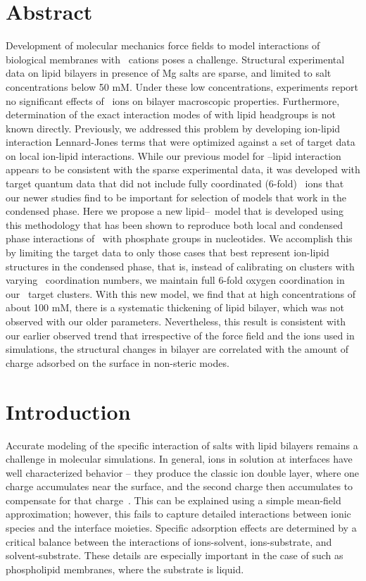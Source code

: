 \section{Abstract}

Development of molecular mechanics force fields to model interactions of biological membranes with \mg~cations poses a challenge.
Structural experimental data on lipid bilayers in presence of Mg salts are sparse, and limited to salt concentrations below 50 mM.
Under these low concentrations, experiments report no significant effects of \mg~ions  on bilayer macroscopic properties.
Furthermore, determination of the exact interaction modes of \mg with lipid headgroups is not known directly.
Previously, we addressed this problem by developing ion-lipid interaction
Lennard-Jones terms that were optimized against a set of target data on local ion-lipid interactions.
While our previous model for \mg--lipid interaction appears to be consistent with the sparse experimental data,
it was developed with target quantum data that did not include fully coordinated (6-fold) \mg~ions that our newer studies find to be important for selection of models that work in the condensed phase.
Here we propose a new lipid--\mg~model that
is developed using this methodology that has been shown to reproduce both local and condensed phase interactions of \mg~with phosphate groups in nucleotides.
We accomplish this by limiting the target data to only those cases that best represent ion-lipid structures in the condensed phase,
that is, instead of calibrating on clusters with varying \mg~coordination numbers, we maintain full 6-fold oxygen coordination in our
\mg~target clusters. With this new model, we find that at high concentrations of about 100 mM, there is a
systematic thickening of lipid bilayer, which was not observed with our older \mg{} parameters. Nevertheless,
this result is consistent with our earlier observed trend that irrespective of the force field and the ions used in simulations,
the structural changes in bilayer are correlated with the amount of charge adsorbed on the surface in non-steric modes.



\section{Introduction}

Accurate modeling of the specific interaction of salts with lipid bilayers remains a challenge in molecular simulations.
In general, ions in solution at interfaces have well characterized behavior -- they produce the classic ion double layer, where
one charge accumulates near the surface, and the second charge then accumulates to compensate for
that charge~\cite{israelachvili:2011:intermol}.
This can be explained using a simple mean-field approximation;
however, this fails to capture detailed interactions between ionic species and
the interface moieties. Specific adsorption effects are determined by a critical
balance between the interactions of ions-solvent, ions-substrate,
and solvent-substrate. These details are especially important in the case of
such as phospholipid membranes, where the substrate is liquid.

